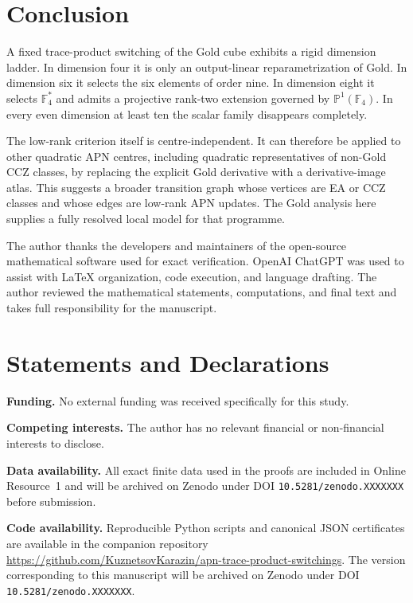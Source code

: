\documentclass[pdflatex,sn-mathphys-num]{sn-jnl}
\theoremstyle{thmstyleone}
\theoremstyle{thmstyletwo}
\theoremstyle{thmstylethree}
\newcommand{\F}{\mathbb F}
\begin{document}
\section{Conclusion}\label{sec:conclusion}

A fixed trace-product switching of the Gold cube exhibits a rigid dimension ladder.  In dimension four it is only an output-linear reparametrization of Gold.  In dimension six it selects the six elements of order nine.  In dimension eight it selects $\F_4^*$ and admits a projective rank-two extension governed by $\mathbb P^1(\F_4)$.  In every even dimension at least ten the scalar family disappears completely.

The low-rank criterion itself is centre-independent.  It can therefore be applied to other quadratic APN centres, including quadratic representatives of non-Gold CCZ classes, by replacing the explicit Gold derivative with a derivative-image atlas.  This suggests a broader transition graph whose vertices are EA or CCZ classes and whose edges are low-rank APN updates.  The Gold analysis here supplies a fully resolved local model for that programme.

The author thanks the developers and maintainers of the open-source mathematical software used for exact verification.  OpenAI ChatGPT was used to assist with LaTeX organization, code execution, and language drafting.  The author reviewed the mathematical statements, computations, and final text and takes full responsibility for the manuscript.

\section*{Statements and Declarations}

\textbf{Funding.} No external funding was received specifically for this study.

\textbf{Competing interests.} The author has no relevant financial or non-financial interests to disclose.

\textbf{Data availability.} All exact finite data used in the proofs are included in Online Resource~1 and will be archived on Zenodo under DOI \texttt{10.5281/zenodo.XXXXXXX} before submission.

\textbf{Code availability.} Reproducible Python scripts and canonical JSON certificates are available in the companion repository \url{https://github.com/KuznetsovKarazin/apn-trace-product-switchings}. The version corresponding to this manuscript will be archived on Zenodo under DOI \texttt{10.5281/zenodo.XXXXXXX}.
\end{document}
